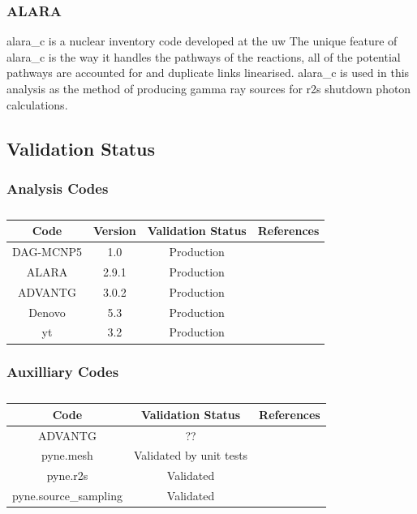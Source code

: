 \documentclass[12pt]{article}
\begin{document}
\subsubsection{ALARA}
\gls{alara_c} \cite{alara} is a nuclear inventory code developed at the \gls{uw}
The unique feature of \gls{alara_c} is the way it handles the
pathways of the reactions, all of the potential pathways are accounted for and
duplicate links linearised. \gls{alara_c} is used in this analysis as the method
of producing gamma ray sources for \gls{r2s} shutdown photon calculations.
\subsection{Validation Status}
\subsubsection*{Analysis Codes}
\begin{centering}
 \begin{table}[ht!]
  \begin{tabular}{c | c | c | c}
  \hline
  Code & Version & Validation Status & References \\
  \hline 
  DAG-MCNP5 & 1.0 & Production & \cite{dagmc_validation}\\
  ALARA & 2.9.1 & Production & \cite{alara}\\
  ADVANTG & 3.0.2 & Production & \cite{advantg}\\
  Denovo & 5.3 & Production & \cite{denovo} \\
  yt & 3.2 & Production & \\
  \end{tabular}
 \caption{}
 \label{table:validation}
 \end{table}
\end{centering}
\subsubsection*{Auxilliary Codes}
\begin{centering}
 \begin{table}[ht!]
  \begin{tabular}{c | c | c}
  \hline
  Code & Validation Status & References \\    
  \hline
  ADVANTG & ?? & \\
  pyne.mesh & Validated by unit tests & \\
  pyne.r2s & Validated & \\
  pyne.source\_sampling & Validated & \\
 \end{tabular}
 \caption{}
 \label{table:validation_aux}
 \end{table}
\end{centering}
\newpage
\end{document}
